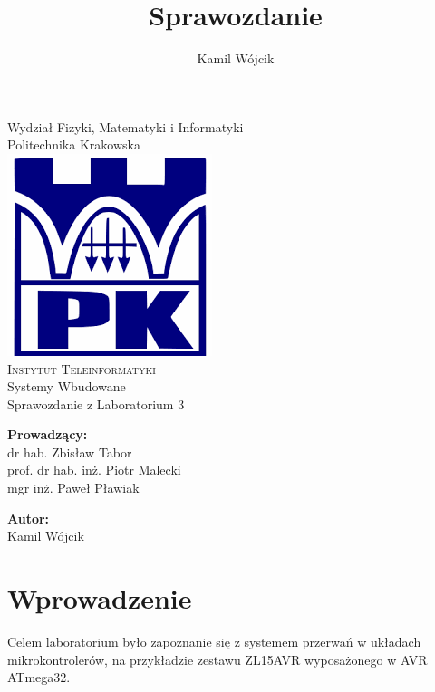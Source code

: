 \documentclass[12pt]{article}
\author{Kamil Wójcik}
\title{Sprawozdanie}
\begin{document}
\begin{titlepage}
 
\begin{center}

{\Large {Wydział Fizyki, Matematyki i Informatyki\\Politechnika Krakowska
} }
\\[1cm] 
\includegraphics[scale=0.4]{pk.png}
\\[1cm]

{\Huge \textsc{Instytut Teleinformatyki}}\\[0.7cm]
{\Huge Systemy Wbudowane}\\[2cm]
{\Large Sprawozdanie z Laboratorium 3}\\[2cm]

\begin{minipage}[l]{0.5\textwidth}
    \begin{flushleft}
        \textbf{\textsf{Prowadzący:}}\\
        \large dr hab. Zbisław Tabor\\
        \large prof. dr hab. inż. Piotr Malecki\\
        \large mgr inż. Paweł Pławiak 
        \end{flushleft}
\end{minipage}
\begin{minipage}[l]{0.3\textwidth}
    \begin{flushright}
        \textbf{\textsf{Autor:}}\\
        \linespread{1}
        \large Kamil Wójcik
    \end{flushright}
\end{minipage}
 
\end{center}
 
\end{titlepage}



\section{Wprowadzenie}
Celem laboratorium było zapoznanie się z systemem przerwań w układach mikrokontrolerów, na przykładzie zestawu ZL15AVR wyposażonego w AVR ATmega32.
\end{document}
